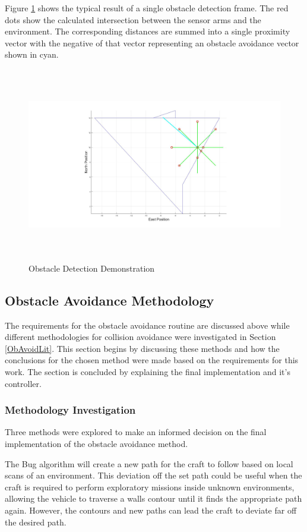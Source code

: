 			Figure \ref{IM_ObAvoidSetup} shows the typical result of a single obstacle detection frame. The red dots show the calculated intersection between the sensor arms and the environment. The corresponding distances are summed into a single proximity vector with the negative of that vector representing an obstacle avoidance vector shown in cyan. 
			
			\begin{figure}[H]
				\centering
				\includegraphics[height = 8.5cm]{../References/Diagrams/ObAvoidDemo.jpg}     
				\caption{Obstacle Detection Demonstration}
				\label{IM_ObAvoidSetup}
			\end{figure}
	
		\subsection{Obstacle Avoidance Methodology}
		The requirements for the obstacle avoidance routine are discussed above while different methodologies for collision avoidance were investigated in Section \ref{ObAvoidLit}. This section begins by discussing these methods and how the conclusions for the chosen method were made based on the requirements for this work. The section is concluded by explaining the final implementation and it's controller.
		
			\subsubsection{Methodology Investigation}
			Three methods were explored to make an informed decision on the final implementation of the obstacle avoidance method. 
			
			The Bug algorithm will create a new path for the craft to follow based on local scans of an environment. This deviation off the set path could be useful when the craft is required to perform exploratory missions inside unknown environments, allowing the vehicle to traverse a walls contour until it finds the appropriate path again. However, the contours and new paths can lead the craft to deviate far off the desired path. 
			
